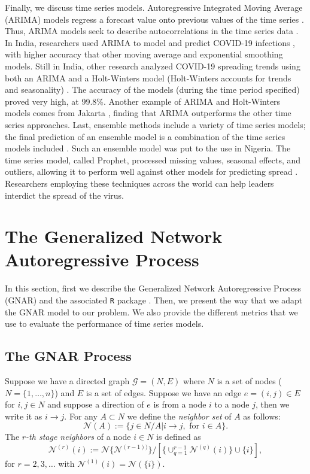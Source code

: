 Finally, we discuss time series models. Autoregressive Integrated Moving Average (ARIMA) models regress a forecast value onto previous values of the time series \cite{HALLETT1986125}. Thus, ARIMA models seek to describe autocorrelations in the time series data \cite{Hyndman:2018}. In India, researchers used ARIMA to model and predict COVID-19 infections \cite{Tandon:2020}, with higher accuracy that other moving average and exponential smoothing models. Still in India, other research analyzed COVID-19 spreading trends using both an ARIMA and a Holt-Winters model (Holt-Winters accounts for trends and seasonality) \cite{Panda:2020}. The accuracy of the models (during the time period specified) proved very high, at 99.8\%. Another example of ARIMA and Holt-Winters models comes from Jakarta \cite{Sulasikin:EtAl:2020}, finding that ARIMA outperforms the other time series approaches. Last, ensemble methods include a variety of time series models; the final prediction of an ensemble model is a combination of the time series models included \cite{Kotu:2014}. Such an ensemble model was put to the use in Nigeria.  The time series model, called Prophet, processed missing values, seasonal effects, and outliers, allowing it to perform well against other models for predicting spread \cite{Abdulmajeed:2020}. Researchers employing these techniques across the world can help leaders interdict the spread of the virus.
 

\section{The Generalized Network Autoregressive Process}
\label{sec:methods}

In this section, first we describe the Generalized Network Autoregressive Process (GNAR) \cite{GNARreference} and the associated \texttt{R} package \cite{GNARCRAN}. Then, we present the way that we adapt the GNAR model to our problem. We also provide the different metrics that we use to evaluate the performance of time series models.

\subsection{The GNAR Process}

Suppose we have a directed graph $\mathcal{G} = (N, E)$ where $N$ is a set of nodes ($N = \{1, \ldots, n\}$) and $E$ is a set of edges. Suppose we have an edge $e = (i, j) \in E$ for $i, j \in N$ and suppose a direction of $e$ is from a node $i$ to a node $j$, then we write it as $i \to j$.  For any $A \subset N$ we define the {\em neighbor set} of $A$ as follows:
\[
\mathcal{N}(A) := \{j \in N/A| i \to j , \mbox{ for } i \in A\}.
\]
The {\em $r$-th stage neighbors} of a node $i \in N$ is defined as
\[
\mathcal{N}^{(r)}(i) := \mathcal{N}\{\mathcal{N}^{(r-1))}\}/[\{\cup_{q = 1}^{r-1}\mathcal{N}^{(q)}(i)\}\cup \{i\}],
\]
for $r = 2, 3, \ldots$ with $\mathcal{N}^{(1)}(i) = \mathcal{N}(\{i\})$. 

